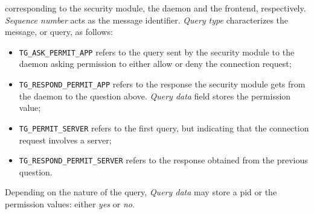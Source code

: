 corresponding to the security module, the daemon and the frontend, respectively. \textit{Sequence number} acts as the message identifier. \textit{Query type} characterizes the message, or query, as follows:

\begin{itemize}
\item \texttt{TG\_ASK\_PERMIT\_APP} refers to the query sent by the security module to the daemon asking permission to either allow or deny the connection request;
\item \texttt{TG\_RESPOND\_PERMIT\_APP} refers to the response the security module gets from the daemon to the question above. \textit{Query data} field stores the permission value;
\item \texttt{TG\_PERMIT\_SERVER} refers to the first query, but indicating that the connection request involves a server;
\item \texttt{TG\_RESPOND\_PERMIT\_SERVER} refers to the response obtained from the previous question.
\end{itemize}

Depending on the nature of the query, \textit{Query data} may store a \gls{pid} or the permission values: either \textit{yes} or \textit{no}. 